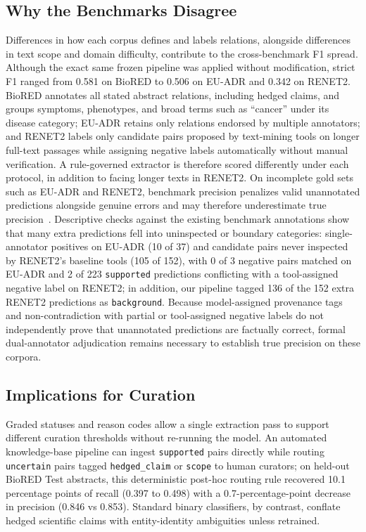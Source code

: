 \documentclass[preprint,10pt,letterpaper]{elsarticle}
\newcommand{\st}[1]{\texttt{#1}}             %
\begin{document}
\subsection{Why the Benchmarks Disagree}
Differences in how each corpus defines and labels relations, alongside differences in text scope and domain difficulty, contribute to the cross-benchmark F1 spread. Although the exact same frozen pipeline was applied without modification, strict F1 ranged from 0.581 on BioRED to 0.506 on EU-ADR and 0.342 on RENET2. BioRED annotates all stated abstract relations, including hedged claims, and groups symptoms, phenotypes, and broad terms such as ``cancer'' under its disease category; EU-ADR retains only relations endorsed by multiple annotators; and RENET2 labels only candidate pairs proposed by text-mining tools on longer full-text passages while assigning negative labels automatically without manual verification. A rule-governed extractor is therefore scored differently under each protocol, in addition to facing longer texts in RENET2. On incomplete gold sets such as EU-ADR and RENET2, benchmark precision penalizes valid unannotated predictions alongside genuine errors and may therefore underestimate true precision~\cite{wadhwa2023revisiting,fan2024evaluating}. Descriptive checks against the existing benchmark annotations show that many extra predictions fell into uninspected or boundary categories: single-annotator positives on EU-ADR (10 of 37) and candidate pairs never inspected by RENET2's baseline tools (105 of 152), with 0 of 3 negative pairs matched on EU-ADR and 2 of 223 \st{supported} predictions conflicting with a tool-assigned negative label on RENET2; in addition, our pipeline tagged 136 of the 152 extra RENET2 predictions as \st{background}. Because model-assigned provenance tags and non-contradiction with partial or tool-assigned negative labels do not independently prove that unannotated predictions are factually correct, formal dual-annotator adjudication remains necessary to establish true precision on these corpora.

\subsection{Implications for Curation}
Graded statuses and reason codes allow a single extraction pass to support different curation thresholds without re-running the model. An automated knowledge-base pipeline can ingest \st{supported} pairs directly while routing \st{uncertain} pairs tagged \st{hedged\_claim} or \st{scope} to human curators; on held-out BioRED Test abstracts, this deterministic post-hoc routing rule recovered 10.1 percentage points of recall (0.397 to 0.498) with a 0.7-percentage-point decrease in precision (0.846 vs 0.853). Standard binary classifiers, by contrast, conflate hedged scientific claims with entity-identity ambiguities unless retrained.
\end{document}
